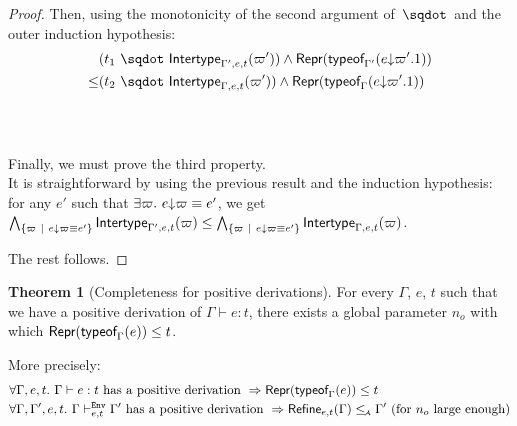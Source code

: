 \documentclass[a4paper]{article}
\theoremstyle{definition}
\newtheorem{theorem}{Theorem}
\begin{document}
\begin{proof}
  Then, using the monotonicity of the second argument of $\worra {}{}$ and the outer induction hypothesis:
  \begin{align*}
    &(\worra {t_1} {\env {\Gamma',e,t} (\varpi')}) \land \tsrep {\tyof {\occ e {\varpi'.1}} {\Gamma'}}\\
    \leq &(\worra {t_2} {\env {\Gamma,e,t} (\varpi')}) \land \tsrep {\tyof {\occ e {\varpi'.1}} {\Gamma}}
  \end{align*}
  \\

  \ 

  Finally, we must prove the third property.\\
  It is straightforward by using the previous result and the induction hypothesis:\\
  for any $e'$ such that $\exists \varpi.\ e{\downarrow}\varpi \equiv e'$, we get
  $\bigwedge_{\{\varpi~|~ e{\downarrow}\varpi \equiv e'\}} \textsf{Intertype}_{\Gamma',e,t} (\varpi) \leq \bigwedge_{\{\varpi~|~ e{\downarrow}\varpi \equiv e'\}} \textsf{Intertype}_{\Gamma,e,t} (\varpi)$.

  The rest follows.
  \end{proof}

  \begin{theorem}[Completeness for positive derivations]
    For every $\Gamma$, $e$, $t$ such that we have a positive derivation of $\Gamma \vdash e:t$,
    there exists a global parameter $n_o$ with which $\textsf{Repr}(\textsf{typeof}_{\Gamma}(e)) \leq t$.

    More precisely:
    \begin{align*}
      &\forall \Gamma, e, t.\ \Gamma \vdash e:t \text{ has a positive derivation } \Rightarrow \textsf{Repr}(\textsf{typeof}_{\Gamma}(e)) \leq t\\
      &\forall \Gamma, \Gamma', e, t.\ \Gamma \vdash^{\texttt{Env}}_{e,t} \Gamma' \text{ has a positive derivation } \Rightarrow \textsf{Refine}_{e,t}(\Gamma) \leq_{\!\scriptscriptstyle\mathcal{A}} \Gamma' \text{ (for $n_o$ large enough)}
    \end{align*}
  \end{theorem}
\end{document}
